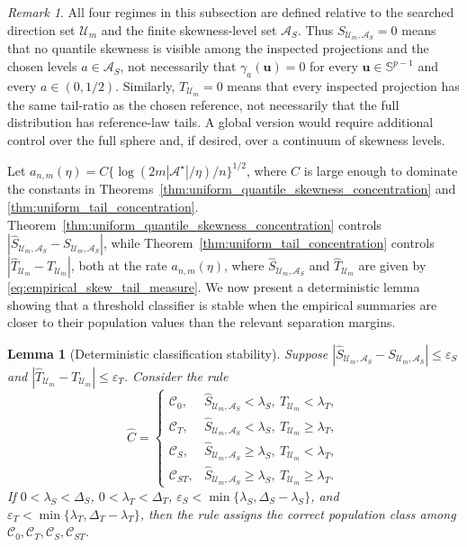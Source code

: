 \documentclass[11pt]{article}
\theoremstyle{plain}
\newtheorem{lemma}{Lemma}
\theoremstyle{definition}
\theoremstyle{remark}
\newtheorem{remark}{Remark}
\def\u{\bm{u}}
\begin{document}
\begin{remark}
	All four regimes in this subsection are defined relative to the searched direction set \(\mathcal U_m\) and the finite skewness-level set \(\mathcal A_S\). Thus \(S_{\mathcal U_m,\mathcal A_S}=0\) means that no quantile skewness is visible among the inspected projections and the chosen levels \(a\in\mathcal A_S\), not necessarily that \(\gamma_{a}(\u)=0\) for every \(\u\in\mathbb S^{p-1}\) and every \(a\in(0,1/2)\). Similarly, \(T_{\mathcal U_m}=0\) means that every inspected projection has the same tail-ratio as the chosen reference, not necessarily that the full distribution has reference-law tails. A global version would require additional control over the full sphere and, if desired, over a continuum of skewness levels.
\end{remark}

Let \(a_{n,m}(\eta)=C\{\log(2m|\mathcal A^\star|/\eta)/n\}^{1/2}\), where \(C\) is large enough to dominate the constants in Theorems~\ref{thm:uniform_quantile_skewness_concentration} and \ref{thm:uniform_tail_concentration}. Theorem~\ref{thm:uniform_quantile_skewness_concentration} controls \(|\widehat S_{\mathcal U_m,\mathcal A_S}-S_{\mathcal U_m,\mathcal A_S}|\), while Theorem~\ref{thm:uniform_tail_concentration} controls \(|\widehat T_{\mathcal U_m}-T_{\mathcal U_m}|\), both at the rate \(a_{n,m}(\eta)\), where \(\widehat S_{\mathcal U_m,\mathcal A_S}\) and \(\widehat T_{\mathcal U_m}\) are given by \eqref{eq:empirical_skew_tail_measure}. We now present a deterministic lemma showing that a threshold classifier is stable when the empirical summaries are closer to their population values than the relevant separation margins.

\begin{lemma}[Deterministic classification stability]
	\label{lem:deterministic_classification_stability}
	Suppose \(|\widehat S_{\mathcal U_m,\mathcal A_S}-S_{\mathcal U_m,\mathcal A_S}|\le\varepsilon_S\) and \(|\widehat T_{\mathcal U_m}-T_{\mathcal U_m}|\le\varepsilon_T\). Consider the rule
	\[
	\widehat C =
	\begin{cases}
		\mathcal C_0, & \widehat S_{\mathcal U_m,\mathcal A_S}<\lambda_S,\ \widehat T_{\mathcal U_m}<\lambda_T,\\
		\mathcal C_T, & \widehat S_{\mathcal U_m,\mathcal A_S}<\lambda_S,\ \widehat T_{\mathcal U_m}\ge\lambda_T,\\
		\mathcal C_S, & \widehat S_{\mathcal U_m,\mathcal A_S}\ge\lambda_S,\ \widehat T_{\mathcal U_m}<\lambda_T,\\
		\mathcal C_{ST}, & \widehat S_{\mathcal U_m,\mathcal A_S}\ge\lambda_S,\ \widehat T_{\mathcal U_m}\ge\lambda_T.
	\end{cases}
	\]
	If \(0<\lambda_S<\Delta_S\), \(0<\lambda_T<\Delta_T\), \(\varepsilon_S<\min\{\lambda_S,\Delta_S-\lambda_S\}\), and \(\varepsilon_T<\min\{\lambda_T,\Delta_T-\lambda_T\}\), then the rule assigns the correct population class among \(\mathcal C_0,\mathcal C_T,\mathcal C_S,\mathcal C_{ST}\).
\end{lemma}
\end{document}

